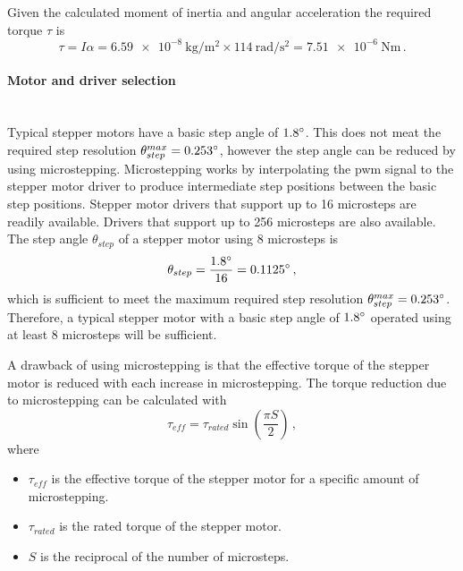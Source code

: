 Given the calculated moment of inertia and angular acceleration the required torque $\tau$ is
\begin{equation}
    \tau = I\alpha = \SI{6.59e-8}{\kg\per\meter\squared} \times \SI{114}{\radian\per\second\squared} = \SI{7.51e-6}{\newton\meter}\,.
\end{equation}


\paragraph{Motor and driver selection}\hfill\\
Typical stepper motors have a basic step angle of $1.8^{\circ}$. This does not meat the required step resolution $\theta_{step}^{max} = 0.253^{\circ}$, however the step angle can be reduced by using microstepping. Microstepping works by interpolating the \gls{pwm} signal to the stepper motor driver to produce intermediate step positions between the basic step positions. Stepper motor drivers that support up to 16 microsteps are readily available. Drivers that support up to 256 microsteps are also available. The step angle $\theta_{step}$ of a stepper motor using 8 microsteps is
\begin{equation}
    \theta_{step} = \frac{1.8^{\circ}}{16} = 0.1125^{\circ}\,,
\end{equation}
which is sufficient to meet the maximum required step resolution $\theta_{step}^{max} = 0.253^{\circ}$. Therefore, a typical stepper motor with a basic step angle of $1.8^{\circ}$ operated using at least 8 microsteps will be sufficient.

A drawback of using microstepping is that the effective torque of the stepper motor is reduced with each increase in microstepping. The torque reduction due to microstepping can be calculated with
\begin{equation}
    \tau_{eff} = \tau_{rated} \sin \left(\frac{\pi S}{2}\right)\,,
\end{equation}
where
\begin{itemize}
    \item $\tau_{eff}$ is the effective torque of the stepper motor for a specific amount of microstepping.
    \item $\tau_{rated}$ is the rated torque of the stepper motor.
    \item $S$ is the reciprocal of the number of microsteps.
\end{itemize}


